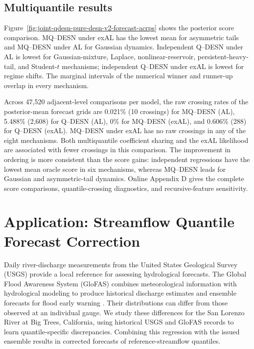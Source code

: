 \documentclass[12pt,letterpaper]{article}
\numberwithin{equation}{section}
\begin{document}
\subsection{Multiquantile results}
\label{subsec:simulation-mq-results}

Figure~\ref{fig:joint-qdesn-pure-desn-v2-forecast-acrps} shows the posterior
score comparison. MQ--DESN under exAL has the lowest mean for asymmetric
tails and MQ--DESN under AL for Gaussian dynamics. Independent Q--DESN
under AL is lowest for
Gaussian-mixture, Laplace, nonlinear-reservoir, persistent-heavy-tail, and
Student-\(t\) mechanisms; independent Q--DESN under exAL is lowest for regime shifts.
The marginal intervals of the numerical winner and runner-up overlap in
every mechanism.

Across 47,520 adjacent-level comparisons per model, the raw crossing rates of
the posterior-mean forecast grids are 0.021\% (10 crossings) for MQ--DESN
(AL), 5.488\% (2,608) for Q--DESN (AL), 0\% for MQ--DESN (exAL), and
0.606\% (288) for Q--DESN (exAL).
MQ--DESN under exAL has no raw crossings in any of the eight mechanisms.
Both multiquantile coefficient sharing and the exAL likelihood are associated
with fewer crossings in this comparison. The improvement in ordering is
more consistent than the score gains: independent regressions have the
lowest mean oracle score in six mechanisms, whereas MQ--DESN leads for
Gaussian and asymmetric-tail dynamics. Online Appendix D gives the complete
score comparisons, quantile-crossing diagnostics, and recursive-feature
sensitivity.


\clearpage

\section{Application: Streamflow Quantile Forecast Correction}
\label{sec:data}

Daily river-discharge measurements from the United States Geological Survey
(USGS) provide a local reference for assessing hydrological forecasts.
The Global Flood Awareness System (GloFAS) combines meteorological
information with hydrological modeling to produce historical discharge
estimates and ensemble forecasts for flood early warning
\citep{AlfieriEtAl2013GloFAS,HarriganEtAl2023GloFASForecasts,
CEMS2026GloFASDocumentation}. Their distributions can differ from those
observed at an individual gauge. We study these differences for the San
Lorenzo River at Big Trees, California, using historical USGS and GloFAS
records to learn quantile-specific discrepancies. Combining this regression
with the issued ensemble results in corrected forecasts of reference-streamflow
quantiles.
\end{document}
